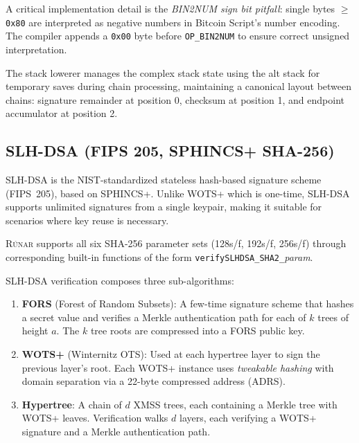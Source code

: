 \documentclass[11pt,a4paper]{article}
\newcommand{\op}[1]{\texttt{OP\_#1}}
\newcommand{\runar}{\textsc{Rúnar}}
\begin{document}
A critical implementation detail is the \emph{BIN2NUM sign bit pitfall}:
single bytes $\geq$ \texttt{0x80} are interpreted as negative numbers in
Bitcoin Script's number encoding. The compiler appends a \texttt{0x00} byte
before \op{BIN2NUM} to ensure correct unsigned interpretation.

The stack lowerer manages the complex stack state using the alt stack for
temporary saves during chain processing, maintaining a canonical layout
between chains: signature remainder at position 0, checksum at position 1,
and endpoint accumulator at position 2.

\subsection{SLH-DSA (FIPS 205, SPHINCS+ SHA-256)}
\label{sec:slhdsa}

SLH-DSA is the NIST-standardized stateless hash-based signature scheme
(FIPS~205), based on SPHINCS+. Unlike WOTS+ which is one-time, SLH-DSA
supports unlimited signatures from a single keypair, making it suitable
for scenarios where key reuse is necessary.

\runar{} supports all six SHA-256 parameter sets (128s/f, 192s/f, 256s/f)
through corresponding built-in functions of the form
\mbox{\texttt{verifySLHDSA\_SHA2\_}\textit{param}}.

SLH-DSA verification composes three sub-algorithms:
\begin{enumerate}[nosep]
  \item \textbf{FORS} (Forest of Random Subsets): A few-time signature
    scheme that hashes a secret value and verifies a Merkle authentication
    path for each of $k$ trees of height $a$. The $k$ tree roots are
    compressed into a FORS public key.
  \item \textbf{WOTS+} (Winternitz OTS): Used at each hypertree layer
    to sign the previous layer's root. Each WOTS+ instance uses
    \emph{tweakable hashing} with domain separation via a 22-byte
    compressed address (ADRS).
  \item \textbf{Hypertree}: A chain of $d$ XMSS trees, each containing
    a Merkle tree with WOTS+ leaves. Verification walks $d$ layers,
    each verifying a WOTS+ signature and a Merkle authentication path.
\end{enumerate}
\end{document}
